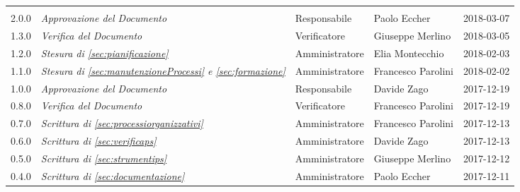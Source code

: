 \newpage 
\section*{}
\begin{table}[H]
	\centering
	\begin{tabular}{p{2cm}|C{4cm}|C{3cm}|C{3cm}|R{2cm}}

		
		
			 &  & &  & \\
		
		
		2.0.0  & \emph{Approvazione del Documento} & Responsabile & Paolo Eccher&  2018-03-07 \\
		\hline
		
		1.3.0  &  \emph{Verifica del Documento} & Verificatore & Giuseppe Merlino & 2018-03-05 \\
		\hline
		
		1.2.0  & \emph{Stesura di \ref{sec:pianificazione}} &  Amministratore & Elia Montecchio & 2018-02-03  \\
		\hline
		
		1.1.0  & \emph{Stesura di \ref{sec:manutenzioneProcessi} e \ref{sec:formazione}} &  Amministratore & Francesco Parolini & 2018-02-02  \\
		\hline
		
		1.0.0  & \emph{Approvazione del Documento} & Responsabile & Davide Zago &  2017-12-19 \\
		\hline
		
		0.8.0  &  \emph{Verifica del Documento} & Verificatore & Francesco Parolini & 2017-12-19 \\
		\hline
		
		0.7.0  & \emph{Scrittura di \ref{sec:processiorganizzativi}}  & Amministratore & Francesco Parolini & 2017-12-13\\
		\hline
		
		0.6.0  & \emph{Scrittura di \ref{sec:verificaps}} &  Amministratore & Davide Zago  & 2017-12-13 \\
		\hline
		
		0.5.0  & \emph{Scrittura di \ref{sec:strumentips}} & Amministratore & Giuseppe Merlino & 2017-12-12\\
		\hline
		
		0.4.0  &\emph{Scrittura di \ref{sec:documentazione}}& Amministratore & Paolo Eccher  & 2017-12-11 \\
		\hline
		

\end{tabular}
\end{table}
